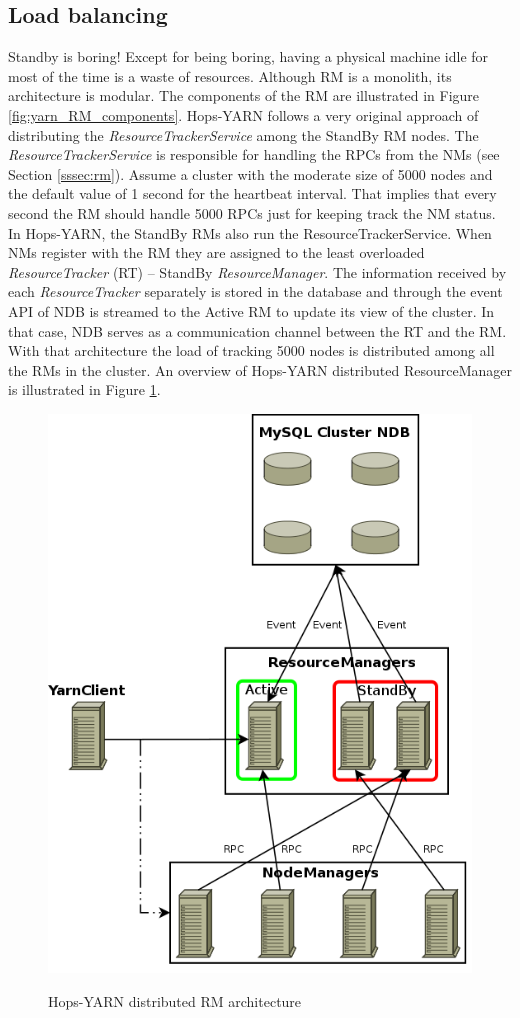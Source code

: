 \subsection{Load balancing}
\label{ssec:hops_yarn_load_balance}
Standby is boring! Except for being boring, having a physical machine
idle for most of the time is a waste of resources. Although RM is a
monolith, its architecture is modular. The components of the RM are illustrated in
Figure \ref{fig:yarn_RM_components}. Hops-YARN follows a very original
approach of distributing the \emph{ResourceTrackerService} among the
StandBy RM nodes. The \emph{ResourceTrackerService} is responsible for
handling the RPCs from the NMs (see Section \ref{sssec:rm}). Assume a
cluster with the moderate size of 5000 nodes and the default value of 1
second for the heartbeat interval. That implies that every second the
RM should handle 5000 RPCs just for keeping track the NM status. In
Hops-YARN, the StandBy RMs also run the
ResourceTrackerService. When NMs register with the RM they are
assigned to the least overloaded \emph{ResourceTracker} (RT) -- StandBy
\emph{ResourceManager}. The information received by each
\emph{ResourceTracker} separately is stored in the
database and through the event API of NDB is streamed to the Active
RM to update its view of the cluster. In that case, NDB serves as a
communication channel between the RT and the RM. With that
architecture the load of tracking 5000 nodes is distributed among all
the RMs in the cluster. An overview of Hops-YARN distributed
ResourceManager is illustrated in Figure \ref{fig:hopsyarn_dist_rm}.

\begin{figure}
\centering
\includegraphics[scale=0.5]{resources/images/Background/hopsyarn_arch_overview.png}
\label{fig:hopsyarn_dist_rm}
\caption{Hops-YARN distributed RM architecture}
\end{figure}